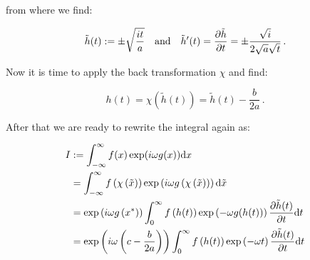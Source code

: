 \documentclass[a4paper,10pt]{article}
\begin{document}
from where we find:

\begin{equation}
 \tilde{h}(t) := \pm \sqrt{\frac{i t}{a}}
 \quad \mathrm{and} \quad
 \tilde{h}^{\prime}(t) = \frac{\partial \tilde{h}}{\partial t} = \pm \frac{\sqrt{i}}{2\sqrt{a}\sqrt{t}} \,.
\end{equation}

Now it is time to apply the back transformation $\chi$ and find:

\begin{equation}
 h(t) = \chi \left(\tilde{h}(t)\right) = \tilde{h}(t) - \frac{b}{2a} \,.
\end{equation}

%
%
%

After that we are ready to rewrite the integral again as:


\begin{equation}
\begin{split}
 I & := \int_{-\infty}^{\infty} f(x) \exp(i \omega g(x)) \mathrm{d}x \\
   &  = \int_{-\infty}^{\infty} f\left(\chi\left(\tilde{x}\right)\right)
                                \exp\left(i \omega g\left(\chi\left(\tilde{x}\right)\right)\right) \mathrm{d}\tilde{x} \\
   &  = \exp\left(i \omega g\left(x^{*}\right)\right)
        \int_{0}^{\infty} f\left(h(t)\right) \exp\left(-\omega g(h(t))\right) \frac{\partial \tilde{h}(t)}{\partial t} \mathrm{d}t \\
   &  = \exp\left(i \omega \left(c - \frac{b}{2a}\right)\right)
        \int_{0}^{\infty} f\left(h(t)\right) \exp\left(-\omega t\right) \frac{\partial \tilde{h}(t)}{\partial t} \mathrm{d}t \\
\end{split}
\end{equation}
\end{document}
